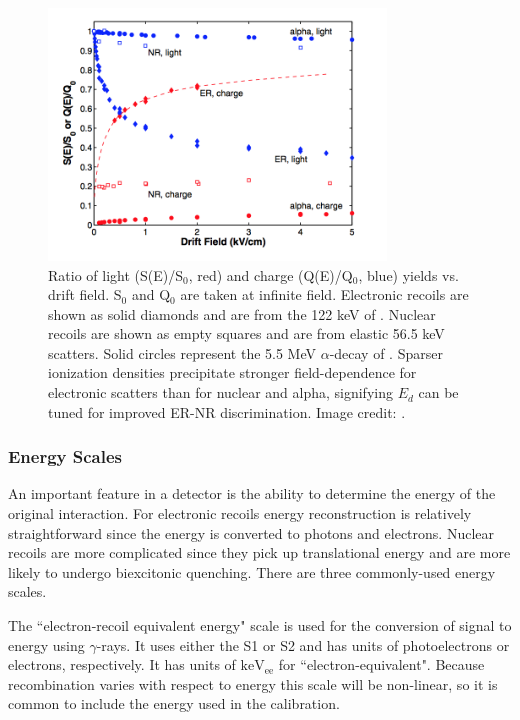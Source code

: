 \begin{figure}
\centering
\includegraphics[width=0.8\textwidth]{LYQY}
\caption{Ratio of light (S(E)/S$_{0}$, red) and charge (Q(E)/Q$_{0}$, blue) yields vs. drift field.  S$_{0}$ and Q$_{0}$ are taken at
infinite field.  Electronic recoils are shown as solid diamonds and are from the 122 keV \gammaray of .  Nuclear recoils
are shown as empty squares and are from elastic 56.5 keV scatters.  Solid circles represent the 5.5 MeV $\alpha$-decay of
.  Sparser ionization densities precipitate stronger field-dependence for electronic scatters than for nuclear and
alpha, signifying $E_{d}$ can be tuned for improved ER-NR discrimination.  Image credit: .}
\label{fig:tpcs_signals_drift_field}
\end{figure}



\subsubsection{Energy Scales}
\label{subsubsec:tpcs_signals_energy}
An important feature in a detector is the ability to determine the energy of the original interaction.  For electronic recoils energy
reconstruction is relatively straightforward since the energy is converted to photons and electrons.  Nuclear recoils are more
complicated since they pick up translational energy and are more likely to undergo biexcitonic quenching.  There are three commonly-used
energy scales.

The ``electron-recoil equivalent energy" scale is used for the conversion of signal to energy using $\gamma$-rays.  It uses either the S1 or
S2 and has units of photoelectrons or electrons, respectively.  It has units of $\mathrm{keV_{ee}}$ for ``electron-equivalent".  Because
recombination varies with respect to energy this scale will be non-linear, so it is common to include the energy used in the
calibration.

